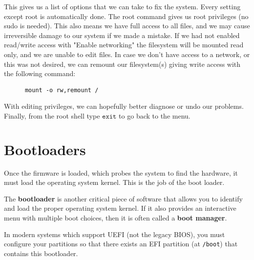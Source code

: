 \documentclass{article}
\begin{document}
    This gives us a list of options that we can take to fix the system. Every setting except root is automatically done. The root command gives us root privileges (no sudo is needed). This also means we have full access to all files, and we may cause irreversible damage to our system if we made a mistake. If we had not enabled read/write access with "Enable networking" the filesystem will be mounted read only, and we are unable to edit files. In case we don't have access to a network, or this was not desired, we can remount our filesystem(s) giving write access with the following command:  
    \begin{lstlisting}
      mount -o rw,remount /
    \end{lstlisting}
    With editing privileges, we can hopefully better diagnose or undo our problems. Finally, from the root shell type $\texttt{exit}$ to go back to the menu. 

\section{Bootloaders} 

  Once the firmware is loaded, which probes the system to find the hardware, it must load the operating system kernel. This is the job of the boot loader.

  \begin{definition}
    The \textbf{bootloader} is another critical piece of software that allows you to identify and load the proper operating system kernel. If it also provides an interactive menu with multiple boot choices, then it is often called a \textbf{boot manager}. 
  \end{definition}

  In modern systems which support UEFI (not the legacy BIOS), you must configure your partitions so that there exists an EFI partition (at \texttt{/boot}) that contains this bootloader. 
\end{document}
